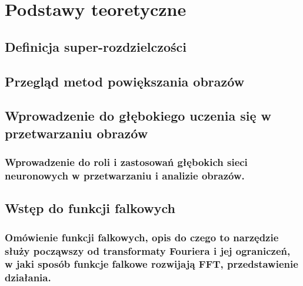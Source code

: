 \chapter{Podstawy teoretyczne}
\section{Definicja super-rozdzielczości}
\section{Przegląd metod powiększania obrazów}
\section{Wprowadzenie do głębokiego uczenia się w przetwarzaniu obrazów}
\subsection{Wprowadzenie do roli i zastosowań głębokich sieci neuronowych w przetwarzaniu i analizie obrazów.}
\section{Wstęp do funkcji falkowych}
\subsection{Omówienie funkcji falkowych, opis do czego to narzędzie służy począwszy od transformaty Fouriera i jej ograniczeń, w jaki sposób funkcje falkowe rozwijają FFT, przedstawienie działania.}